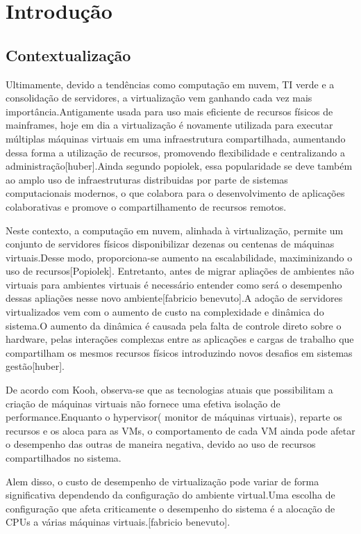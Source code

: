 \chapter{Introdução}
\section{Contextualizaç\~ao}
Ultimamente, devido a tendências como computação em nuvem, TI verde e a consolidação de servidores, a virtualização vem ganhando cada vez mais importância.Antigamente usada para uso mais eficiente de recursos físicos de mainframes, hoje em dia a virtualização é novamente utilizada para executar múltiplas máquinas virtuais em uma infraestrutura compartilhada, aumentando dessa forma a utilização de recursos, promovendo flexibilidade e centralizando a administração[huber].Ainda segundo popiolek, essa popularidade se deve também ao amplo uso de infraestruturas distribuidas por parte de sistemas computacionais modernos, o que colabora para o desenvolvimento de aplicações colaborativas e promove o compartilhamento de recursos remotos.

Neste contexto, a computação em nuvem, alinhada à virtualização, permite um conjunto de servidores físicos disponibilizar dezenas ou centenas de máquinas virtuais.Desse modo, proporciona-se aumento na escalabilidade, maximinizando o uso de recursos[Popiolek]. Entretanto, antes de migrar apliações de ambientes não virtuais para ambientes virtuais é necessário entender como será o desempenho dessas apliações nesse novo ambiente[fabricio benevuto].A adoção de servidores virtualizados vem com o aumento de custo na complexidade e dinâmica do sistema.O aumento da dinâmica é causada pela falta de controle direto sobre o hardware, pelas interações complexas entre as aplicações e cargas de trabalho que compartilham os mesmos recursos físicos introduzindo novos desafios em sistemas gestão[huber].

De acordo com Kooh, observa-se que as tecnologias atuais que possibilitam a criação de máquinas virtuais não fornece uma efetiva isolação de performance.Enquanto o hypervisor( monitor de máquinas virtuais), reparte os recursos e os aloca para as VMs, o comportamento de cada VM ainda pode afetar o desempenho das outras de maneira negativa, devido ao uso de recursos compartilhados no sistema.  

Alem disso, o custo de desempenho de virtualização pode variar de forma significativa dependendo da configuração do ambiente virtual.Uma escolha de configuração que afeta criticamente o desempenho do sistema é a alocação de CPUs a várias máquinas virtuais.[fabricio benevuto].


